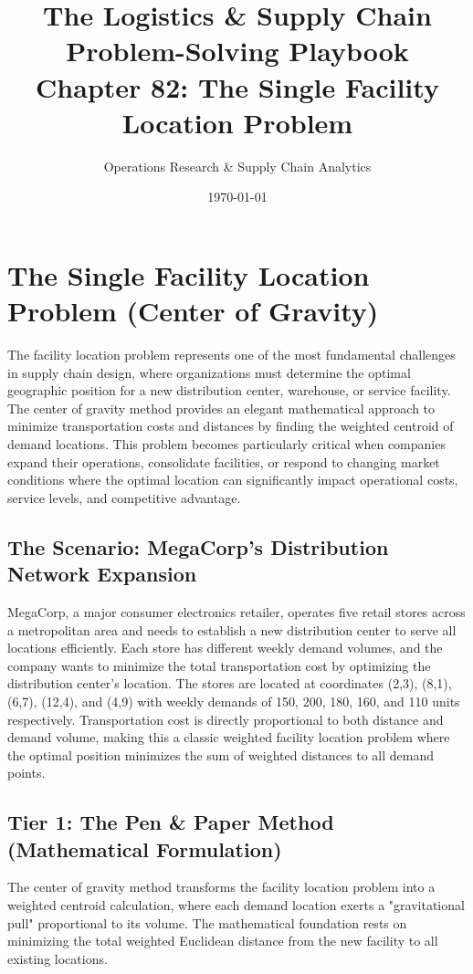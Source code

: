 \documentclass{article}
\title{The Logistics \& Supply Chain Problem-Solving Playbook\\
Chapter 82: The Single Facility Location Problem}
\author{Operations Research \& Supply Chain Analytics}
\date{\today}
\begin{document}
\maketitle

\section{The Single Facility Location Problem (Center of Gravity)}

The facility location problem represents one of the most fundamental challenges in supply chain design, where organizations must determine the optimal geographic position for a new distribution center, warehouse, or service facility. The center of gravity method provides an elegant mathematical approach to minimize transportation costs and distances by finding the weighted centroid of demand locations. This problem becomes particularly critical when companies expand their operations, consolidate facilities, or respond to changing market conditions where the optimal location can significantly impact operational costs, service levels, and competitive advantage.

\subsection{The Scenario: MegaCorp's Distribution Network Expansion}

MegaCorp, a major consumer electronics retailer, operates five retail stores across a metropolitan area and needs to establish a new distribution center to serve all locations efficiently. Each store has different weekly demand volumes, and the company wants to minimize the total transportation cost by optimizing the distribution center's location. The stores are located at coordinates (2,3), (8,1), (6,7), (12,4), and (4,9) with weekly demands of 150, 200, 180, 160, and 110 units respectively. Transportation cost is directly proportional to both distance and demand volume, making this a classic weighted facility location problem where the optimal position minimizes the sum of weighted distances to all demand points.

\subsection{Tier 1: The Pen \& Paper Method (Mathematical Formulation)}

The center of gravity method transforms the facility location problem into a weighted centroid calculation, where each demand location exerts a "gravitational pull" proportional to its volume. The mathematical foundation rests on minimizing the total weighted Euclidean distance from the new facility to all existing locations.
\end{document}
